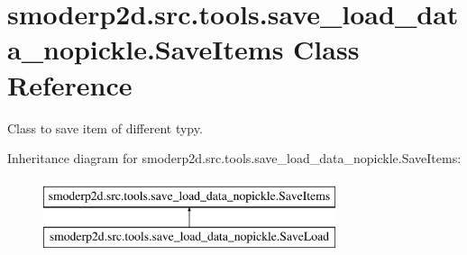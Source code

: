 \hypertarget{classsmoderp2d_1_1src_1_1tools_1_1save__load__data__nopickle_1_1SaveItems}{\section{smoderp2d.\-src.\-tools.\-save\-\_\-load\-\_\-data\-\_\-nopickle.\-Save\-Items Class Reference}
\label{classsmoderp2d_1_1src_1_1tools_1_1save__load__data__nopickle_1_1SaveItems}
}


Class to save item of different typy.  


Inheritance diagram for smoderp2d.\-src.\-tools.\-save\-\_\-load\-\_\-data\-\_\-nopickle.\-Save\-Items\-:\begin{figure}[H]
\begin{center}
\leavevmode
\includegraphics[height=2.000000cm]{classsmoderp2d_1_1src_1_1tools_1_1save__load__data__nopickle_1_1SaveItems}
\end{center}
\end{figure}
